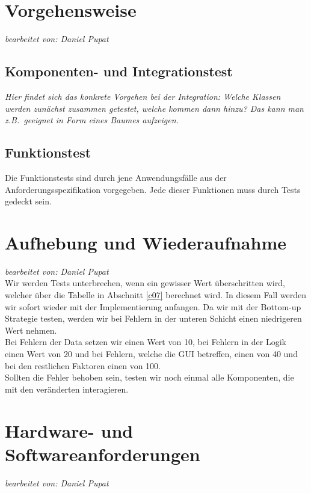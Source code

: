 \documentclass[fontsize=12pt,paper=a4,twoside]{scrartcl}
\begin{document}
\section{Vorgehensweise}\label{c06}
\textit{bearbeitet von: Daniel Pupat }\\

\subsection{Komponenten- und Integrationstest}


{\em Hier findet sich das konkrete Vorgehen bei der Integration: Welche
  Klassen werden zunächst zusammen getestet, welche kommen dann hinzu?
 Das kann man z.B.\ geeignet in Form eines Baumes aufzeigen.}


\subsection{Funktionstest}

Die Funktionstests sind durch jene Anwendungsfälle aus der Anforderungsspezifikation vorgegeben. Jede dieser Funktionen muss durch Tests gedeckt sein.


\section{Aufhebung und Wiederaufnahme}\label{c08}
\textit{bearbeitet von: Daniel Pupat }\\

Wir werden Tests unterbrechen, wenn ein gewisser Wert überschritten wird, welcher über die Tabelle in Abschnitt  \ref{c07} berechnet wird. In diesem Fall werden wir sofort wieder mit der Implementierung anfangen. Da wir mit der Bottom-up Strategie testen, werden wir bei Fehlern in der unteren Schicht einen niedrigeren Wert nehmen.\\
Bei Fehlern der Data setzen wir einen Wert von 10, bei Fehlern in der Logik einen Wert von 20 und bei Fehlern, welche die GUI betreffen, einen von 40 und bei den restlichen Faktoren einen von 100.\\
Sollten die Fehler behoben sein, testen wir noch einmal alle Komponenten, die mit den veränderten interagieren.

\section{Hardware- und Softwareanforderungen}\label{c09}
\textit{bearbeitet von: Daniel Pupat }\\
\end{document}
